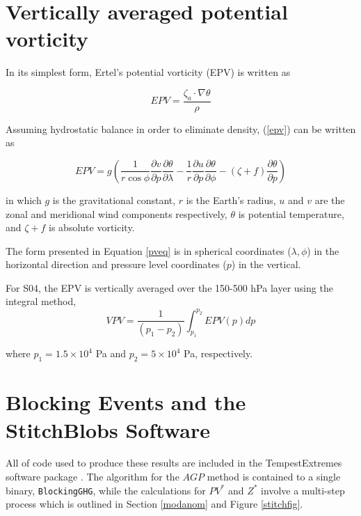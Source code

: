\documentclass[smallextended]{svjour3}       %
\numberwithin{equation}{section}
\begin{document}
\begin{appendices}

\section{Vertically averaged potential vorticity}\label{vpveq}

In its simplest form, Ertel's potential vorticity (EPV) is written as

\begin{equation}
EPV = \frac{\zeta_a\cdot \nabla \theta}{\rho}\label{epv}
\end{equation}

\noindent
Assuming hydrostatic balance in order to eliminate density, (\ref{epv}) can be written as 

\begin{equation}
  EPV=g\left(\frac{1}{r\cos\phi}\frac{\partial v}{\partial p}\frac{\partial \theta}{\partial \lambda}-\frac{1}{r}\frac{\partial u}{\partial p}\frac{\partial \theta}{\partial \phi}-(\zeta+f)\frac{\partial \theta}{\partial p}\right)\label{pveq}
\end{equation}

\noindent
in which $g$ is the gravitational constant, $r$ is the Earth's radius, $u$ and $v$ are the zonal and meridional wind components respectively, $\theta$ is potential temperature, and $\zeta + f$ is absolute vorticity.


The form presented in Equation \ref{pveq} is in spherical coordinates ($\lambda, \phi$) in the horizontal direction and pressure level coordinates ($p$) in the vertical. 


For S04, the EPV is vertically averaged over the 150-500 hPa layer using the integral method, 
\begin{equation}VPV=\frac{1}{(p_1-p_2)}\int_{p_1}^{p_2} EPV(p) dp\end{equation}

\noindent
where $p_1=1.5\times 10^4$ Pa and $p_2=5\times 10^4$ Pa, respectively.
\section{Blocking Events and the StitchBlobs Software}\label{stitchdesc}

All of code used to produce these results are included in the TempestExtremes software package \citep{ullrich_tempestextremes:_2017}. The algorithm for the $AGP$ method is contained to a single binary, \texttt{BlockingGHG}, while the calculations for $PV^*$ and $Z^*$ involve a multi-step process which is outlined in Section \ref{modanom} and Figure \ref{stitchfig}. 



\end{appendices}
\end{document}
